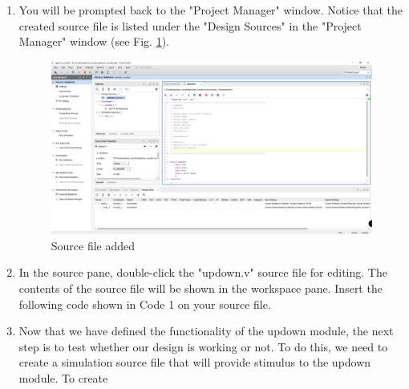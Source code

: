 \documentclass{article}
\begin{document}
\begin{enumerate}
    \item You will be prompted back to the "Project Manager" window. Notice that the created source file is listed under the "Design Sources" in the 
    "Project Manager" window (see Fig. \ref{fig:16-project_window_source_added}).
      \begin{figure}[h!]
        \centering
        \includegraphics[width=\linewidth]{img/program/16-project_window_source_added.png}
        \caption{Source file added}
        \label{fig:16-project_window_source_added}
      \end{figure}

    \clearpage
    \item In the source pane, double-click the "updown.v" source file for editing. The contents of the source file will be shown in the workspace pane.
    Insert the following code shown in Code 1 on your source file. 
      

    \item Now that we have defined the functionality of the updown module, the next step is to test whether our design is working or not. To do this,
    we need to create a simulation source file that will provide stimulus to the updown module. To create 
  \end{enumerate}
\end{document}
